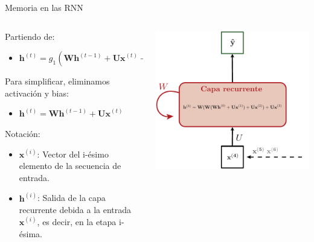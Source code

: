 \documentclass[aspectratio=169]{beamer}
\begin{document}
\begin{frame}{Memoria en las RNN}

	\begin{columns}
		\begin{column}{0.5\textwidth}
			Partiendo de:
			\begin{itemize}
				\item $\mathbf{h}^{(t)} = g_{1}(\mathbf{Wh}^{(t-1)}+\mathbf{Ux}^{(t)}+\mathbf{b}_{h})$
			\end{itemize}			
			Para simplificar, eliminamos activación y bias:
			\begin{itemize}
				\item $\mathbf{h}^{(t)} = \mathbf{Wh}^{(t-1)}+\mathbf{Ux}^{(t)}$
			\end{itemize}
			\vspace{1em}
			Notación:
			\begin{itemize}
			  \item $\mathbf{x}^{(i)}$: Vector del i-ésimo elemento de la secuencia de entrada.
			  \item $\mathbf{h}^{(i)}$: Salida de la capa recurrente debida a la entrada $\mathbf{x}^{(i)}$, es decir, en la etapa i-ésima.
			\end{itemize}
		\end{column}

		\begin{column}{0.5\textwidth}
			\begin{center}
				\includegraphics[width=.8\textwidth]{imgs/tema4/rnn/Memoria4.pdf}
			\end{center}
		\end{column}
	\end{columns}

\end{frame}
\end{document}
